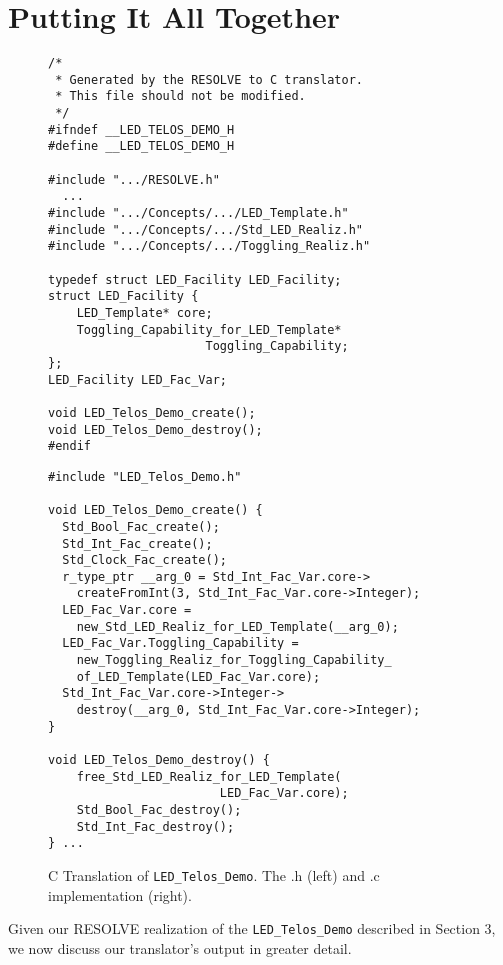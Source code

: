 \section{Putting It All Together}

\begin{figure*}
\begin{minipage}{0.4\textwidth}
\begin{verbatim}
/*
 * Generated by the RESOLVE to C translator. 
 * This file should not be modified.
 */
#ifndef __LED_TELOS_DEMO_H
#define __LED_TELOS_DEMO_H

#include ".../RESOLVE.h"
  ...
#include ".../Concepts/.../LED_Template.h"
#include ".../Concepts/.../Std_LED_Realiz.h"
#include ".../Concepts/.../Toggling_Realiz.h"

typedef struct LED_Facility LED_Facility;
struct LED_Facility {
    LED_Template* core;
    Toggling_Capability_for_LED_Template* 
                      Toggling_Capability;
};
LED_Facility LED_Fac_Var;

void LED_Telos_Demo_create();
void LED_Telos_Demo_destroy();
#endif
\end{verbatim}
\end{minipage}
\hspace{1.5cm} 
\begin{minipage}{0.4\textwidth}
\begin{verbatim}
#include "LED_Telos_Demo.h"

void LED_Telos_Demo_create() {
  Std_Bool_Fac_create();
  Std_Int_Fac_create();
  Std_Clock_Fac_create();
  r_type_ptr __arg_0 = Std_Int_Fac_Var.core->
    createFromInt(3, Std_Int_Fac_Var.core->Integer);
  LED_Fac_Var.core = 
    new_Std_LED_Realiz_for_LED_Template(__arg_0);
  LED_Fac_Var.Toggling_Capability = 
    new_Toggling_Realiz_for_Toggling_Capability_
    of_LED_Template(LED_Fac_Var.core);
  Std_Int_Fac_Var.core->Integer->
    destroy(__arg_0, Std_Int_Fac_Var.core->Integer);
}

void LED_Telos_Demo_destroy() {
    free_Std_LED_Realiz_for_LED_Template(
    				    LED_Fac_Var.core);
    Std_Bool_Fac_destroy();
    Std_Int_Fac_destroy();
} ...
\end{verbatim}
\end{minipage}
\caption{C Translation of \texttt{LED\_Telos\_Demo}. The .h (left) and .c implementation (right).}
\label{fig:demo}
\end{figure*}

Given our RESOLVE realization of the \texttt{LED\_Telos\_Demo} described in Section 3, we now discuss our translator's output in greater detail.


